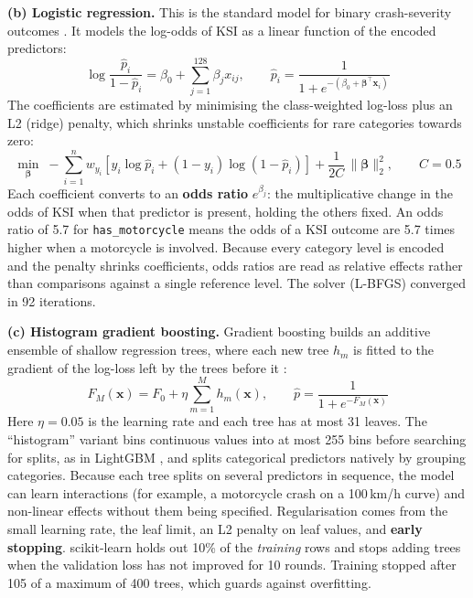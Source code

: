 \documentclass[11pt,a4paper]{article}
\begin{document}
\textbf{(b) Logistic regression.} This is the standard model for binary crash-severity outcomes
\parencite{savolainen2011}. It models the log-odds of KSI as a linear function of the encoded predictors:
\begin{equation}
  \log\frac{\hat{p}_i}{1-\hat{p}_i} = \beta_0 + \sum_{j=1}^{128} \beta_j x_{ij},
  \qquad \hat{p}_i = \frac{1}{1 + e^{-(\beta_0 + \boldsymbol{\beta}^\top \mathbf{x}_i)}}
  \label{eq:logit}
\end{equation}
The coefficients are estimated by minimising the class-weighted log-loss plus an L2 (ridge) penalty, which
shrinks unstable coefficients for rare categories towards zero:
\begin{equation}
  \min_{\boldsymbol{\beta}} \; -\sum_{i=1}^{n} w_{y_i}\left[y_i \log \hat{p}_i + (1-y_i)\log(1-\hat{p}_i)\right]
  + \frac{1}{2C}\,\lVert\boldsymbol{\beta}\rVert_2^2 ,\qquad C = 0.5
  \label{eq:lrloss}
\end{equation}
Each coefficient converts to an \textbf{odds ratio} $e^{\beta_j}$: the multiplicative change in the odds of KSI
when that predictor is present, holding the others fixed. An odds ratio of 5.7 for \texttt{has\_motorcycle} means
the odds of a KSI outcome are 5.7 times higher when a motorcycle is involved. Because every category level is
encoded and the penalty shrinks coefficients, odds ratios are read as relative effects rather than comparisons
against a single reference level. The solver (L-BFGS) converged in 92 iterations.

\textbf{(c) Histogram gradient boosting.} Gradient boosting builds an additive ensemble of shallow regression
trees, where each new tree $h_m$ is fitted to the gradient of the log-loss left by the trees before it
\parencite{friedman2001}:
\begin{equation}
  F_M(\mathbf{x}) = F_0 + \eta \sum_{m=1}^{M} h_m(\mathbf{x}), \qquad \hat{p} = \frac{1}{1 + e^{-F_M(\mathbf{x})}}
  \label{eq:gbm}
\end{equation}
Here $\eta = 0.05$ is the learning rate and each tree has at most 31 leaves. The \enquote{histogram} variant
bins continuous values into at most 255 bins before searching for splits, as in LightGBM \parencite{ke2017}, and
splits categorical predictors natively by grouping categories. Because each tree splits on several predictors in
sequence, the model can learn interactions (for example, a motorcycle crash on a 100\,km/h curve) and
non-linear effects without them being specified. Regularisation comes from the small learning rate, the leaf
limit, an L2 penalty on leaf values, and \textbf{early stopping}. scikit-learn holds out 10\% of the
\emph{training} rows and stops adding trees when the validation loss has not improved for 10 rounds. Training
stopped after 105 of a maximum of 400 trees, which guards against overfitting.
\end{document}
